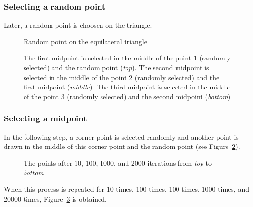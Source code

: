 \subsubsection{Selecting a random point}
Later, a random point is choosen on the triangle.
\begin{figure}[htb]
\centering
{}
\caption{Random point on the equilateral triangle}
\label{fig:randomPoint}
\end{figure}
\begin{figure}[hb!]
\centering
{}
\caption{The first midpoint is selected in the middle of the point $1$ (randomly selected) and the random point (\textit{top}).
The second midpoint is selected in the middle of the point $2$ (randomly selected) and the first midpoint (\textit{middle}).
The third midpoint is selected in the middle of the point $3$ (randomly selected) and the second midpoint (\textit{bottom})}
\label{fig:firstMidPoint}
\end{figure}

\subsubsection{Selecting a midpoint}
In the following step, a corner point is selected randomly and another point is drawn 
in the middle of this corner point and the random point (see Figure~\ref{fig:firstMidPoint}).

\begin{figure}[ht!]
\centering
{}
\caption{The points after 10, 100, 1000, and 2000 iterations 
from \textit{top} to \textit{bottom}}
\label{fig:iterations}
\end{figure}
When this process is repeated for 10 times, 
100 times, 
100 times,
1000 times, and
20000 times, Figure~\ref{fig:iterations} is obtained.

